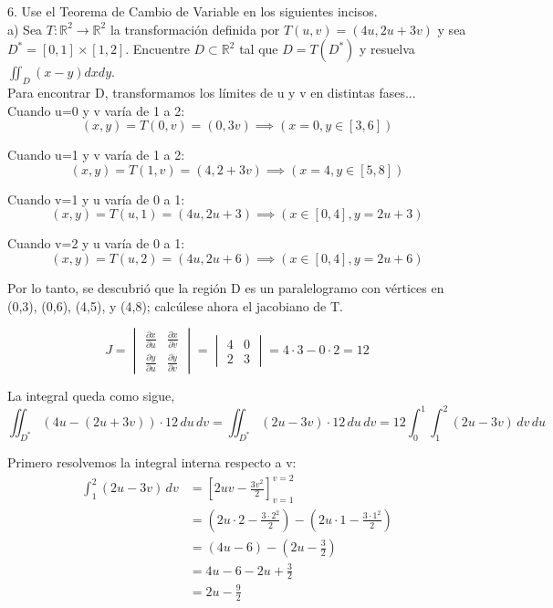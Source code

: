 6. Use el Teorema de Cambio de Variable en los siguientes incisos. \\
a) Sea \( T: \mathbb{R}^{2} \rightarrow \mathbb{R}^{2} \) la transformación definida por \( T(u, v)=(4 u, 2 u+3 v) \) y sea \( D^{*}=[0,1] \times[1,2] \). Encuentre \( D \subset \mathbb{R}^{2} \) tal que \( D=T\left(D^{*}\right) \) y resuelva \( \iint_{D}(x-y) d x d y \). \\
Para encontrar D, transformamos los límites de u y v en distintas fases...\\
Cuando u=0 y v varía de 1 a 2:
\[
  (x, y) = T(0, v) = (0, 3v) \implies (x=0, y \in [3, 6])
  \]


Cuando u=1 y v varía de 1 a 2:
\[
  (x, y) = T(1, v) = (4, 2 + 3v) \implies (x=4, y \in [5, 8])
  \]


Cuando v=1 y u varía de 0 a 1:
\[
  (x, y) = T(u, 1) = (4u, 2u + 3) \implies (x \in [0, 4], y = 2u + 3)
  \]


Cuando v=2 y u varía de 0 a 1:
\[
  (x, y) = T(u, 2) = (4u, 2u + 6) \implies (x \in [0, 4], y = 2u + 6)
  \]


Por lo tanto, se descubrió que la región D es un paralelogramo con vértices en (0,3), (0,6), (4,5), y (4,8); calcúlese ahora el jacobiano de T.

\[
J = \begin{vmatrix}
\frac{\partial x}{\partial u} & \frac{\partial x}{\partial v} \\
\frac{\partial y}{\partial u} & \frac{\partial y}{\partial v}
\end{vmatrix}
= \begin{vmatrix}
4 & 0 \\
2 & 3
\end{vmatrix}
= 4 \cdot 3 - 0 \cdot 2 = 12
\]

La integral queda como sigue,
\[
\iint_{D^*} (4u - (2u + 3v)) \cdot 12 \, du \, dv = \iint_{D^*} (2u - 3v) \cdot 12 \, du \, dv = 12 \int_{0}^{1} \int_{1}^{2} (2u - 3v) \, dv \, du
\]

Primero resolvemos la integral interna respecto a v: \\
\begin{align*}
\int_{1}^{2} (2u - 3v) \, dv &= \left[ 2uv - \frac{3v^2}{2} \right]_{v=1}^{v=2} \\
&= \left(2u \cdot 2 - \frac{3 \cdot 2^2}{2}\right) - \left(2u \cdot 1 - \frac{3 \cdot 1^2}{2}\right) \\
&= \left(4u - 6\right) - \left(2u - \frac{3}{2}\right) \\
&= 4u - 6 - 2u + \frac{3}{2} \\
&= 2u - \frac{9}{2}
\end{align*}

